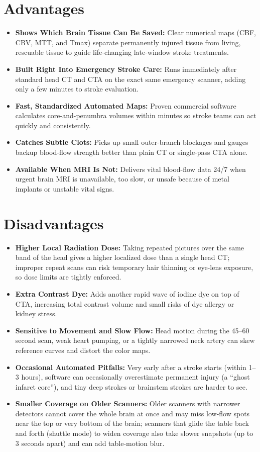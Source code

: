 \section{Advantages}
\begin{itemize}
    \item \textbf{Shows Which Brain Tissue Can Be Saved:} Clear numerical maps (CBF, CBV, MTT, and Tmax) separate permanently injured tissue from living, rescuable tissue to guide life-changing late-window stroke treatments.
    \item \textbf{Built Right Into Emergency Stroke Care:} Runs immediately after standard head CT and CTA on the exact same emergency scanner, adding only a few minutes to stroke evaluation.
    \item \textbf{Fast, Standardized Automated Maps:} Proven commercial software calculates core-and-penumbra volumes within minutes so stroke teams can act quickly and consistently.
    \item \textbf{Catches Subtle Clots:} Picks up small outer-branch blockages and gauges backup blood-flow strength better than plain CT or single-pass CTA alone.
    \item \textbf{Available When MRI Is Not:} Delivers vital blood-flow data 24/7 when urgent brain MRI is unavailable, too slow, or unsafe because of metal implants or unstable vital signs.
\end{itemize}

\section{Disadvantages}
\begin{itemize}
    \item \textbf{Higher Local Radiation Dose:} Taking repeated pictures over the same band of the head gives a higher localized dose than a single head CT; improper repeat scans can risk temporary hair thinning or eye-lens exposure, so dose limits are tightly enforced.
    \item \textbf{Extra Contrast Dye:} Adds another rapid wave of iodine dye on top of CTA, increasing total contrast volume and small risks of dye allergy or kidney stress.
    \item \textbf{Sensitive to Movement and Slow Flow:} Head motion during the 45--60 second scan, weak heart pumping, or a tightly narrowed neck artery can skew reference curves and distort the color maps.
    \item \textbf{Occasional Automated Pitfalls:} Very early after a stroke starts (within 1--3 hours), software can occasionally overestimate permanent injury (a ``ghost infarct core''), and tiny deep strokes or brainstem strokes are harder to see.
    \item \textbf{Smaller Coverage on Older Scanners:} Older scanners with narrower detectors cannot cover the whole brain at once and may miss low-flow spots near the top or very bottom of the brain; scanners that glide the table back and forth (shuttle mode) to widen coverage also take slower snapshots (up to 3 seconds apart) and can add table-motion blur.
\end{itemize}

